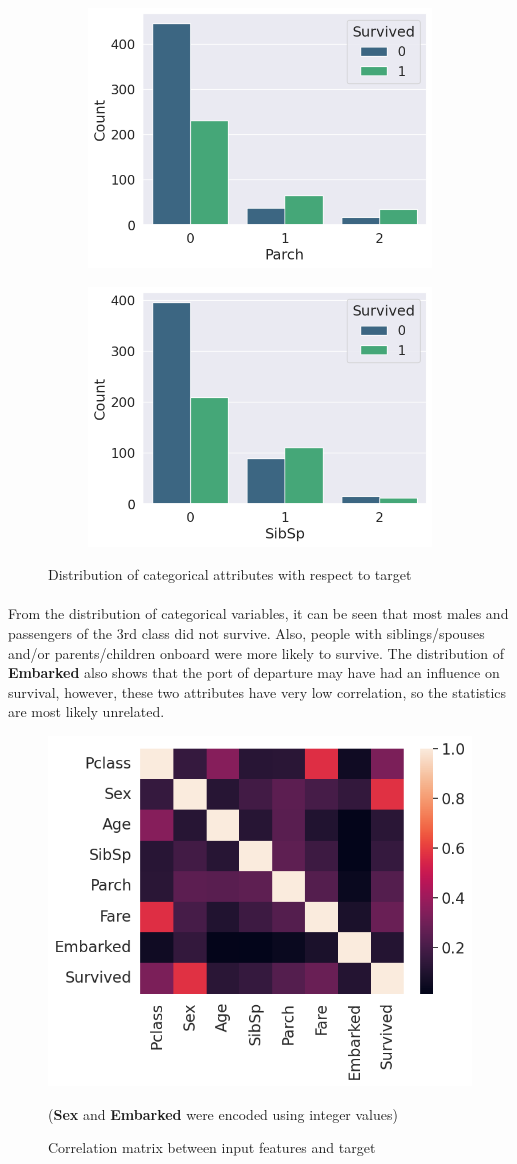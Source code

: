 \documentclass{article}
\begin{document}
\begin{figure}[htb]
\begin{subfigure}
        \centering
        \includegraphics[width=0.49\linewidth]{parch.png}
    \end{subfigure}
    \begin{subfigure}
        \centering
        \includegraphics[width=0.49\linewidth]{sibsp.png}
    \end{subfigure}
    \caption{Distribution of categorical attributes with respect to target}
    \label{fig:enter-label}
\end{figure}

\paragraph{}From the distribution of categorical variables, it can be seen that most males and passengers of the 3rd class did not survive. Also, people with siblings/spouses and/or parents/children onboard were more likely to survive. The distribution of \textbf{Embarked} also shows that the port of departure may have had an influence on survival, however, these two attributes have very low correlation, so the statistics are most likely unrelated.
\newpage
\begin{figure}[htb]
    \centering
    \includegraphics[width=0.75\linewidth]{corr_heatmap.png}
    \caption{Correlation matrix between input features and target}
    \small{(\textbf{Sex} and \textbf{Embarked} were encoded using integer values)}
    \label{fig:enter-label}
\end{figure}
\end{document}
